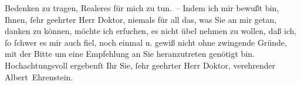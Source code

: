 \begin{ledgroupsized}[t]{13cm}
                    Bedenken zu tragen, Realeres für mich zu tun. – Indem ich mir bewußt bin, Ihnen,
                    ſehr geehrter Herr Doktor, niemals für all das, was Sie an mir getan, danken zu
                    können, möchte ich erſuchen, es nicht übel nehmen zu wollen, daß ich, ſo ſchwer
                    es mir auch fiel, noch einmal u. gewiß nicht ohne zwingende Gründe, mit der
                    Bitte um eine Empfehlung an Sie heranzutreten genötigt bin. Hochachtungsvoll
                    ergebenſt Ihr Sie, ſehr geehrter Herr Doktor, verehrender\pend
           \pstart \spacefill\mbox{Albert Ehrenstein.}\pend{}          \endnumbering{}\end{ledgroupsized}  \newcommand{\dateiname}{L01826}\newcommand{\titel}{Albert Ehrenstein an Arthur Schnitzler, 24. 1. 1909}\newcommand{\editorInnen}{Martin Anton Müller und Gerd-Hermann Susen}
      